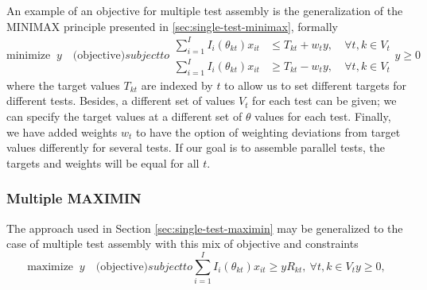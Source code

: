An example of an objective for multiple test assembly is the generalization of the MINIMAX principle presented in \ref{sec:single-test-minimax}, formally
\begin{subequations}
	\begin{equation}
	\mbox{minimize } \ y \quad \mbox{(objective)}
	\end{equation}
	subject to
	\begin{alignat}{2}
	\label{eq:MMINIMAX1}
	\sum_{i=1}^I I_i(\theta_{kt}) x_{it} & \le T_{kt} + w_ty, \ & \forall t,k \in V_t\\
	\label{eq:MMINIMAX2}
	\sum_{i=1}^I I_i(\theta_{kt}) x_{it} & \ge T_{kt} - w_ty, \ & \forall t,k \in V_t
	\end{alignat}
	\begin{equation*}
	y \ge 0
	\end{equation*}
	\label{eq:MMINIMAX}
\end{subequations}
where the target values $T_{kt}$ are indexed by $t$ to allow us to set different targets for different tests. Besides, a different set of values $V_t$ for each test can be given; we can specify the target values at a different set of $\theta$ values for each test. Finally, we have added weights $w_t$ to have the option of weighting deviations from target values differently for several tests. If our goal is to assemble parallel tests, the targets and weights will be equal for all $t$.

\subsubsection{Multiple MAXIMIN}

The approach used in Section \ref{sec:single-test-maximin} may be generalized to the case of multiple test assembly with this mix of objective and constraints
\begin{subequations}\label{eq:maximinmodel}
	\begin{equation}
	\mbox{maximize } \ y \quad \mbox{(objective)}
	\end{equation}
	subject to
	
	\begin{equation}\label{eq:MMAXIMIN2}
	\sum_{i=1}^I I_i(\theta_{kt}) x_{it} \ge yR_{kt}, \ \forall t,k \in V_t
	\end{equation}
	\begin{equation*}
	y \ge 0,
	\end{equation*}
	\label{eq:MMAXIMIN}
\end{subequations}

